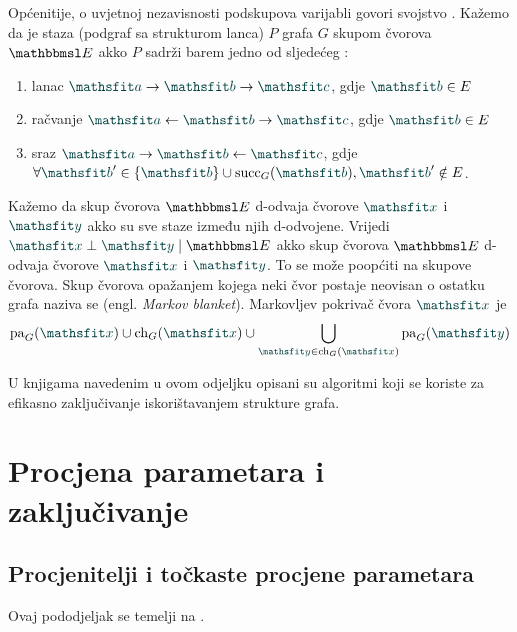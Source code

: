 \documentclass[utf8, diplomski, lmodern]{fer}
\begin{document}
Općenitije, o uvjetnoj nezavisnosti podskupova varijabli govori svojstvo . Kažemo da je staza (podgraf sa strukturom lanca) $P$ grafa $G$  skupom čvorova $\set E$ akko $P$ sadrži barem jedno od sljedećeg \citep{Murphy:2012:MLPP}:
\begin{enumerate}[topsep=0pt,itemsep=0pt,partopsep=0pt]
	\item lanac $\rvar a\rightarrow\rvar b\rightarrow\rvar c$, gdje $\rvar b\in E$
	\item račvanje $\rvar a\leftarrow\rvar b\rightarrow\rvar c$, gdje $\rvar b\in E$
	\item sraz $\rvar a\rightarrow\rvar b\leftarrow\rvar c$, gdje $\forall \rvar b'\in\cbr{\rvar b}\cup\succ_G(\rvar b), \rvar b'\notin E$.
\end{enumerate}
Kažemo da skup čvorova $\set E$ d-odvaja čvorove $\rvar x$ i $\rvar y$ akko su sve staze između njih d-odvojene. Vrijedi $\rvar x\perp\rvar y \mid \set E$ akko skup čvorova $\set E$ d-odvaja čvorove $\rvar x$ i $\rvar y$. To se može poopćiti na skupove čvorova. Skup čvorova opažanjem kojega neki čvor postaje neovisan o ostatku grafa naziva se  (engl. \textit{Markov blanket}). Markovljev pokrivač čvora $\rvar x$ je
\begin{align}
\pa_G(\rvar x)\cup\ch_G(\rvar x)\cup\bigcup_{\rvar y\in\ch_G(\rvar x)}\pa_G(\rvar y)
\end{align}

U knjigama navedenim u ovom odjeljku opisani su algoritmi koji se koriste za efikasno zaključivanje iskorištavanjem strukture grafa.


\section{Procjena parametara i zaključivanje}

\subsection{Procjenitelji i točkaste procjene parametara}

Ovaj pododjeljak se temelji na \citet{Elezovic:2007:VSSV}.
\end{document}
